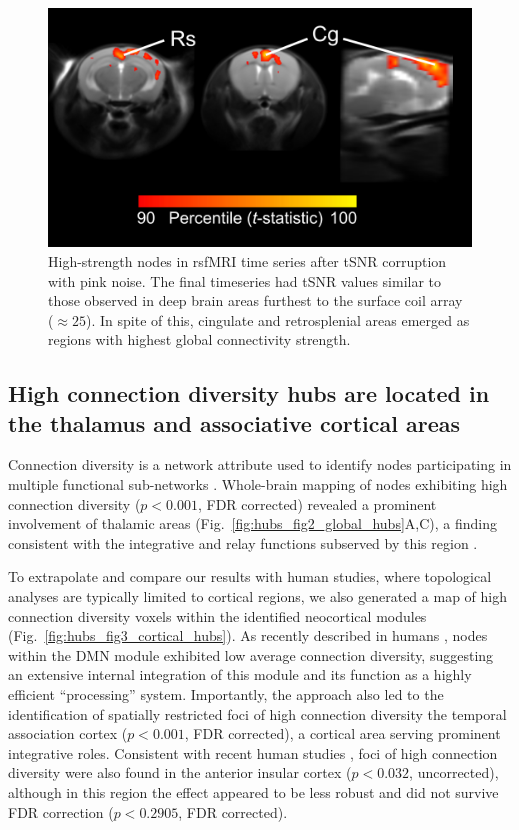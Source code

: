 \begin{figure}[th]
    \centering
    \includegraphics[scale=1.2]{figures/hubs_figure_s5_snr.png}
    \decoRule
    \caption[High-strength nodes in rsfMRI time series after tSNR corruption
    with pink noise.]{High-strength nodes in rsfMRI time series after tSNR
    corruption with pink noise. The final timeseries had tSNR values similar to
    those observed in deep brain areas furthest to the surface coil array
    ($\approx 25$).  In spite of this, cingulate and retrosplenial areas emerged
    as regions with highest global connectivity strength.}
    \label{fig:hubs_figs5_snr}
\end{figure}

\subsection{High connection diversity hubs are located in the thalamus and
associative cortical areas}

Connection diversity is a network attribute used to identify nodes participating
in multiple functional sub-networks \parencite{power2013, rubinov2011}.
Whole-brain mapping of nodes exhibiting high connection diversity ($p < 0.001$,
FDR corrected) revealed a prominent involvement of thalamic areas
(Fig.~\ref{fig:hubs_fig2_global_hubs}A,C), a finding consistent with the
integrative and relay functions subserved by this region
\parencite{draganski2008}. 

To extrapolate and compare our results with human studies, where topological
analyses are typically limited to cortical regions, we also generated a map of
high connection diversity voxels within the identified neocortical modules
(Fig.~\ref{fig:hubs_fig3_cortical_hubs}). As recently described in humans
\parencite{power2011}, nodes within the DMN module exhibited low average
connection diversity, suggesting an extensive internal integration of this
module and its function as a highly efficient “processing” system. Importantly,
the approach also led to the identification of spatially restricted foci of high
connection diversity the temporal association cortex ($p < 0.001$, FDR corrected),
a cortical area serving prominent integrative roles. Consistent with recent
human studies \parencite{power2013}, foci of high connection diversity were also
found in the anterior insular cortex ($p < 0.032$, uncorrected), although in this
region the effect appeared to be less robust and did not survive FDR correction
($p < 0.2905$, FDR corrected).

